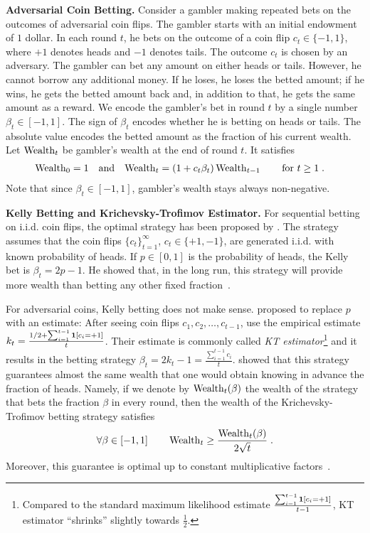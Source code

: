 \textbf{Adversarial Coin Betting.}
Consider a gambler making repeated bets on the outcomes of adversarial coin
flips. The gambler starts with an initial endowment of $1$ dollar. In each
round $t$, he bets on the outcome of a coin flip $c_t \in \{-1,1\}$, where $+1$
denotes heads and $-1$ denotes tails.  The outcome $c_t$ is chosen by an
adversary.  The gambler can bet any amount on either heads or tails. However,
he cannot borrow any additional money. If he loses, he loses the betted amount;
if he wins, he gets the betted amount back and, in addition to that, he gets
the same amount as a reward.  We encode the gambler's bet in round $t$ by a
single number $\beta_t \in [-1,1]$. The sign of $\beta_t$ encodes whether he is
betting on heads or tails. The absolute value encodes the betted amount as the
fraction of his current wealth.  Let $\operatorname{Wealth}_t$ be gambler's wealth at the end
of round $t$. It satisfies
\begin{align}
\label{equation:wealth-recurrence}
\operatorname{Wealth}_0 & = 1 &
& \text{and} &
\operatorname{Wealth}_t & = (1 + c_t \beta_t) \operatorname{Wealth}_{t-1} \qquad \text{for $t \ge 1$} \; .
\end{align}
Note that since $\beta_t \in [-1,1]$, gambler's wealth stays always
non-negative.

\textbf{Kelly Betting and Krichevsky-Trofimov Estimator.}
For sequential betting on i.i.d. coin flips, the optimal strategy has been
proposed by \citet{Kelly-1956}.  The strategy assumes that the coin flips
$\{c_t\}_{t=1}^\infty$, $c_t \in \{+1,-1\}$, are generated i.i.d. with known
probability of heads. If $p \in [0,1]$ is the probability of heads, the Kelly
bet is $\beta_t = 2p - 1$. He showed that, in the long run, this strategy will
provide more wealth than betting any other fixed fraction~\citep{Kelly-1956}.

For adversarial coins, Kelly betting does not make sense.
\citet{Krichevsky-Trofimov-1981} proposed to replace $p$ with an estimate:
After seeing coin flips $c_1, c_2, \dots, c_{t-1}$, use the empirical
estimate $k_t = \frac{1/2 + \sum_{i=1}^{t-1} \mathbf{1}[c_i = +1]}{t}$. Their
estimate is commonly called \emph{KT estimator}\footnote{Compared to the
standard maximum likelihood estimate $\frac{\sum_{i=1}^{t-1} \mathbf{1}[c_i =
+1]}{t-1}$, KT estimator ``shrinks'' slightly towards $\frac{1}{2}$.} and it
results in the betting strategy $\beta_t = 2k_t - 1 = \tfrac{\sum_{i=1}^{t-1}
c_i}{t}$.  \citeauthor{Krichevsky-Trofimov-1981} showed that this strategy
guarantees almost the same wealth that one would obtain knowing in advance the
fraction of heads. Namely, 
if we denote by $\operatorname{Wealth}_t(\beta)$ the wealth of the strategy that bets the fraction
$\beta$ in every round, then the wealth of the Krichevsky-Trofimov betting strategy
satisfies
\begin{equation}
\label{equation:kt-wealth-lower-bound}
\forall \beta \in [-1,1] \qquad \operatorname{Wealth}_t \ge \frac{\operatorname{Wealth}_t(\beta)}{2\sqrt{t}} \; .
\end{equation}
Moreover, this guarantee is optimal up to constant multiplicative factors~\citep{Cesa-Bianchi-Lugosi-2006}.

